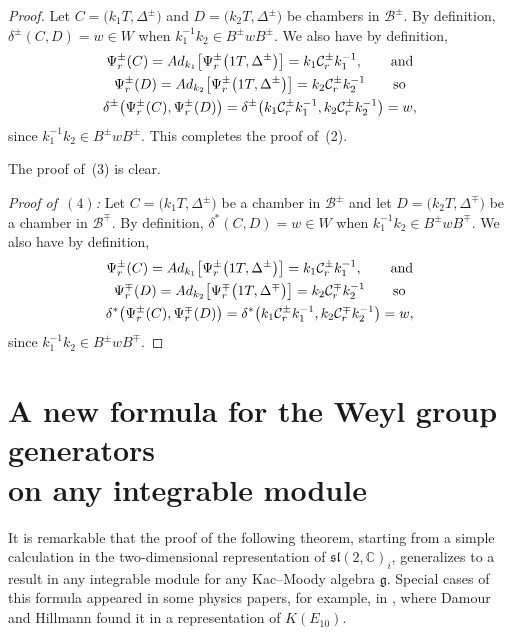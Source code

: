 \documentclass[11pt]{article}
\numberwithin{equation}{section}
\numberwithin{equation}{section}
\def\C{{\mathbb C}}
\def\cB{\mathcal B}
\def\cC{\mathcal C}
\def\fg{\mathfrak{g}}
\def\fsl{\mathfrak{sl}}
\begin{document}
\begin{proof}
Let $C = \big(k_1T,\Delta^\pm\big)$ and $D = \big(k_2T,\Delta^\pm\big)$ be chambers in $\cB^\pm$. By definition, $\delta^\pm(C,D) = w\in W$ when $k_1^{-1} k_2\in B^\pm w B^\pm$.
We also have by definition,
\begin{gather*}
\Psi_r^\pm(C) = {\rm Ad}_{k_1}\big[\Psi_r^\pm\big(1T,\Delta^\pm\big)\big] = k_1 \cC_r^\pm k_1^{-1}, \qquad\hbox{and}\\
 \Psi_r^\pm(D) = {\rm Ad}_{k_2}\big[\Psi_r^\pm\big(1T,\Delta^\pm\big)\big] = k_2 \cC_r^\pm k_2^{-1} \qquad\hbox{so}\\
 \delta^\pm\big(\Psi_r^\pm(C),\Psi_r^\pm(D)\big) = \delta^\pm\big(k_1 \cC_r^\pm k_1^{-1}, k_2 \cC_r^\pm k_2^{-1}\big) = w,
\end{gather*}
since $k_1^{-1} k_2\in B^\pm w B^\pm$. This completes the proof of~(2).

The proof of~(3) is clear.

{\it Proof of~$(4)$:}
Let $C = \big(k_1T,\Delta^\pm\big)$ be a chamber in $\cB^\pm$ and let $D = \big(k_2T,\Delta^\mp\big)$ be a chamber in $\cB^\mp$. By definition,
$\delta^*(C,D) = w\in W$ when $k_1^{-1} k_2\in B^\pm w B^\mp$.
We also have by definition,
\begin{gather*}
\Psi_r^\pm(C) = {\rm Ad}_{k_1}\big[\Psi_r^\pm\big(1T,\Delta^\pm\big)\big] = k_1 \cC_r^\pm k_1^{-1}, \qquad\hbox{and}\\
\Psi_r^\mp(D) = {\rm Ad}_{k_2}\big[\Psi_r^\mp\big(1T,\Delta^\mp\big)\big] = k_2 \cC_r^\mp k_2^{-1} \qquad\hbox{so}\\
\delta^*\big(\Psi_r^\pm(C),\Psi_r^\mp(D)\big) = \delta^*\big(k_1 \cC_r^\pm k_1^{-1}, k_2 \cC_r^\mp k_2^{-1}\big) = w,
\end{gather*}
since $k_1^{-1} k_2\in B^\pm w B^\mp$.
\end{proof}

\appendix
\section[A new formula for the Weyl group generators on any integrable module]{A new formula for the Weyl group generators\\ on any integrable module}

It is remarkable that the proof of the following theorem, starting from a simple calculation in the two-dimensional representation of
$\fsl(2,\C)_i$, generalizes to a result in any integrable module for any Kac--Moody algebra $\fg$. Special cases of this formula appeared
in some physics papers, for example, in \cite{DamourHillmann09}, where Damour and Hillmann found it in a representation of
$K(E_{10})$.
\end{document}

